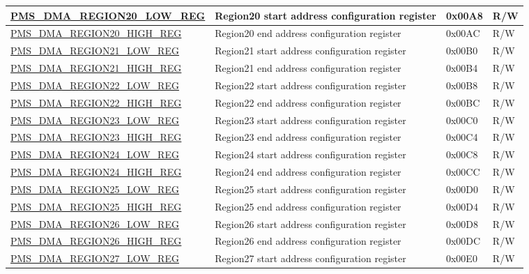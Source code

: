 \begin{longtable}{ | L{7.4cm} | L{6cm} | L{1.3cm} | L{1cm} | }
\hyperref[regdesc:PMSDMAREGIONNLOWREG]{PMS\_DMA\_REGION20\_LOW\_REG} & Region20 start address configuration register & 0x00A8 & R/W \\ \hline
\hyperref[regdesc:PMSDMAREGIONNHIGHREG]{PMS\_DMA\_REGION20\_HIGH\_REG} & Region20 end address configuration register & 0x00AC & R/W \\ \hline
\hyperref[regdesc:PMSDMAREGIONNLOWREG]{PMS\_DMA\_REGION21\_LOW\_REG} & Region21 start address configuration register & 0x00B0 & R/W \\ \hline
\hyperref[regdesc:PMSDMAREGIONNHIGHREG]{PMS\_DMA\_REGION21\_HIGH\_REG} & Region21 end address configuration register & 0x00B4 & R/W \\ \hline
\hyperref[regdesc:PMSDMAREGIONNLOWREG]{PMS\_DMA\_REGION22\_LOW\_REG} & Region22 start address configuration register & 0x00B8 & R/W \\ \hline
\hyperref[regdesc:PMSDMAREGIONNHIGHREG]{PMS\_DMA\_REGION22\_HIGH\_REG} & Region22 end address configuration register & 0x00BC & R/W \\ \hline
\hyperref[regdesc:PMSDMAREGIONNLOWREG]{PMS\_DMA\_REGION23\_LOW\_REG} & Region23 start address configuration register & 0x00C0 & R/W \\ \hline
\hyperref[regdesc:PMSDMAREGIONNHIGHREG]{PMS\_DMA\_REGION23\_HIGH\_REG} & Region23 end address configuration register & 0x00C4 & R/W \\ \hline
\hyperref[regdesc:PMSDMAREGIONNLOWREG]{PMS\_DMA\_REGION24\_LOW\_REG} & Region24 start address configuration register & 0x00C8 & R/W \\ \hline
\hyperref[regdesc:PMSDMAREGIONNHIGHREG]{PMS\_DMA\_REGION24\_HIGH\_REG} & Region24 end address configuration register & 0x00CC & R/W \\ \hline
\hyperref[regdesc:PMSDMAREGIONNLOWREG]{PMS\_DMA\_REGION25\_LOW\_REG} & Region25 start address configuration register & 0x00D0 & R/W \\ \hline
\hyperref[regdesc:PMSDMAREGIONNHIGHREG]{PMS\_DMA\_REGION25\_HIGH\_REG} & Region25 end address configuration register & 0x00D4 & R/W \\ \hline
\hyperref[regdesc:PMSDMAREGIONNLOWREG]{PMS\_DMA\_REGION26\_LOW\_REG} & Region26 start address configuration register & 0x00D8 & R/W \\ \hline
\hyperref[regdesc:PMSDMAREGIONNHIGHREG]{PMS\_DMA\_REGION26\_HIGH\_REG} & Region26 end address configuration register & 0x00DC & R/W \\ \hline
\hyperref[regdesc:PMSDMAREGIONNLOWREG]{PMS\_DMA\_REGION27\_LOW\_REG} & Region27 start address configuration register & 0x00E0 & R/W \\ \hline

\end{longtable}
